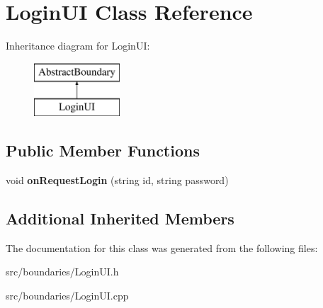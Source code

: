 \hypertarget{class_login_u_i}{}\section{Login\+UI Class Reference}
\label{class_login_u_i}
Inheritance diagram for Login\+UI\+:\begin{figure}[H]
\begin{center}
\leavevmode
\includegraphics[height=2.000000cm]{class_login_u_i}
\end{center}
\end{figure}
\subsection*{Public Member Functions}
\begin{DoxyCompactItemize}
\item 
\mbox{\label{class_login_u_i_a5f384aaed36f6ee7c7f78d4a905cd77f}} 
void {\bfseries on\+Request\+Login} (string id, string password)
\end{DoxyCompactItemize}
\subsection*{Additional Inherited Members}


The documentation for this class was generated from the following files\+:\begin{DoxyCompactItemize}
\item 
src/boundaries/Login\+U\+I.\+h\item 
src/boundaries/Login\+U\+I.\+cpp\end{DoxyCompactItemize}
